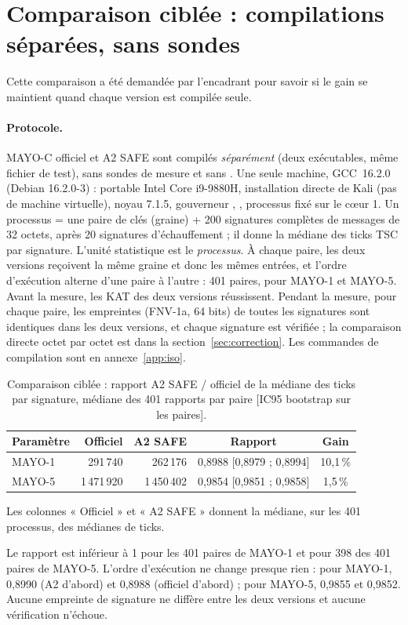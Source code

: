 \section[Comparaison ciblée]{Comparaison ciblée : compilations séparées, sans sondes}\label{sec:iso}
Cette comparaison a été demandée par l'encadrant pour savoir si le gain se maintient quand chaque version est compilée seule.
\paragraph{Protocole.} MAYO-C officiel et A2 SAFE sont compilés \emph{séparément} (deux exécutables, même fichier de test), sans sondes de mesure et sans . Une seule machine, GCC~16.2.0 (Debian 16.2.0-3) : portable Intel Core i9-9880H, installation directe de Kali (pas de machine virtuelle), noyau 7.1.5, gouverneur , , processus fixé sur le cœur 1. Un processus = une paire de clés (graine) + 200 signatures complètes de messages de 32 octets, après 20 signatures d'échauffement ; il donne la médiane des ticks TSC par signature. L'unité statistique est le \emph{processus}. À chaque paire, les deux versions reçoivent la même graine et donc les mêmes entrées, et l'ordre d'exécution alterne d'une paire à l'autre : 401 paires, pour MAYO-1 et MAYO-5. Avant la mesure, les KAT des deux versions réussissent. Pendant la mesure, pour chaque paire, les empreintes (FNV-1a, 64 bits) de toutes les signatures sont identiques dans les deux versions, et chaque signature est vérifiée ; la comparaison directe octet par octet est dans la section~\ref{sec:correction}. Les commandes de compilation sont en annexe~\ref{app:iso}.
\begin{table}[ht]\centering\small
\caption{Comparaison ciblée : rapport A2 SAFE / officiel de la médiane des ticks par signature, médiane des 401 rapports par paire [IC95 bootstrap sur les paires].}\label{tab:iso}
\begin{tabular}{@{}lrrcc@{}}\toprule
Paramètre & Officiel & A2 SAFE & Rapport & Gain\\\midrule
MAYO-1 & 291\,740 & 262\,176 & 0,8988 [0,8979 ; 0,8994] & 10,1\,\%\\
MAYO-5 & 1\,471\,920 & 1\,450\,402 & 0,9854 [0,9851 ; 0,9858] & 1,5\,\%\\\bottomrule
\end{tabular}
\par\smallskip\footnotesize Les colonnes « Officiel » et « A2 SAFE » donnent la médiane, sur les 401 processus, des médianes de ticks.
\end{table}
\F{} Le rapport est inférieur à 1 pour les 401 paires de MAYO-1 et pour 398 des 401 paires de MAYO-5. L'ordre d'exécution ne change presque rien : pour MAYO-1, 0,8990 (A2 d'abord) et 0,8988 (officiel d'abord) ; pour MAYO-5, 0,9855 et 0,9852. Aucune empreinte de signature ne diffère entre les deux versions et aucune vérification n'échoue.
